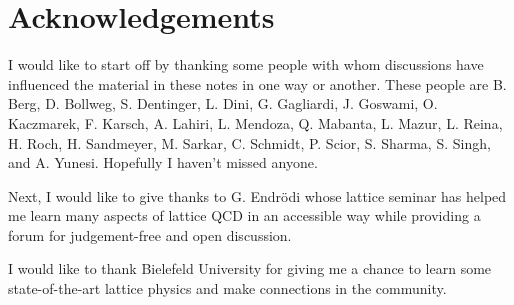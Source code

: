 \documentclass[12pt]{book}
\theoremstyle{definition}
\newenvironment{frontstuff}
  {\centering\chapter*{}}
  {\clearpage}
\begin{document}
\begin{frontstuff}


\end{frontstuff} %


\chapter{Acknowledgements}

I would like to start off by thanking some people with whom discussions
have influenced the material in these notes in one way or another.
These people are
B. Berg,
D. Bollweg,
S. Dentinger,
L. Dini,
G. Gagliardi,
J. Goswami,
O. Kaczmarek,
F. Karsch,
A. Lahiri,
L. Mendoza,
Q. Mabanta,
L. Mazur,
L. Reina,
H. Roch,
H. Sandmeyer,
M. Sarkar,
C. Schmidt,
P. Scior,
S. Sharma,
S. Singh,
and
A. Yunesi.
Hopefully I haven't missed anyone.

Next, I would like to give thanks to G. Endr\"odi whose lattice seminar
has helped me learn many aspects of lattice QCD in an accessible way while
providing a forum for judgement-free and open discussion.

I would like to thank Bielefeld University for giving me a chance to learn some
state-of-the-art lattice physics and make connections in the community.
\end{document}
